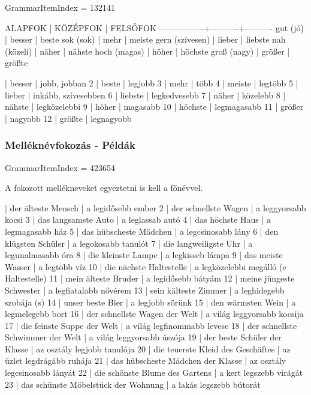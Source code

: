 \documentclass{article}
\newenvironment{desc}{\verbatim}{\endverbatim}
\newenvironment{exmp}{\verbatim}{\endverbatim}
\begin{document}
GrammarItemIndex = 132141

\begin{desc}
ALAPFOK         | KÖZÉPFOK | FELSŐFOK
----------------+----------+----------
gut (jó)        | besser   | beste
sok (sok)       | mehr     | meiste
gern (szívesen) | lieber   | liebste
nah (közeli)    | näher    | nähste
hoch (magas)    | höher    | höchste
groß (nagy)     | größer   | größte
\end{desc}

\begin{exmp}
1 | besser | jobb, jobban
2 | beste | legjobb
3 | mehr | több
4 | meiste | legtöbb
5 | lieber | inkább, szívesebben
6 | liebste | legkedvesebb
7 | näher | közelebb
8 | nähste | legközelebbi
9 | höher | magasabb
10 | höchste | legmagasabb
11 | größer | nagyobb
12 | größte | legnagyobb
\end{exmp}

\subsubsection{Melléknévfokozás - Példák}

GrammarItemIndex = 423654

\begin{desc}
A fokozott mellékneveket egyeztetni is kell a főnévvel.
\end{desc}

\begin{exmp}
1 | der älteste Mensch | a legidősebb ember
2 | der schnellste Wagen | a leggyorsabb kocsi
3 | das langsamste Auto | a leglassab autó
4 | das höchste Haus | a legmagasabb ház
5 | das hübscheste Mädchen | a legcsinosabb lány
6 | den klügsten Schüler | a legokosabb tanulót
7 | die langweiligste Uhr | a legunalmasabb óra
8 | die kleinste Lampe | a legkisseb lámpa
9 | das meiste Wasser | a legtöbb víz
10 | die nächste Haltestelle | a legközelebbi megálló (e Haltestelle)
11 | mein älteste Bruder | a legidősebb bátyám
12 | meine jüngeste Schwester | a legfiatalabb nővérem
13 | sein kälteste Zimmer | a leghidegebb szobája (s)
14 | unser beste Bier | a legjobb sörünk
15 | den wärmsten Wein | a legmelegebb bort
16 | der schnellste Wagen der Welt | a világ leggyorsabb kocsija
17 | die feinste Suppe der Welt | a világ legfinommabb levese
18 | der schnellste Schwimmer der Welt | a világ leggyorsabb úszója
19 | der beste Schüler der Klasse | az osztály legjobb tanulója
20 | die teuerste Kleid des Geschäftes | az üzlet legdrágább ruhája
21 | das hübscheste Mädchen der Klasse | az osztály legcsinosabb lányát
22 | die schönste Blume des Gartens | a kert legszebb virágát
23 | das schünste Möbelstück der Wohnung | a lakás legszebb bútorát
\end{exmp}
\end{document}
